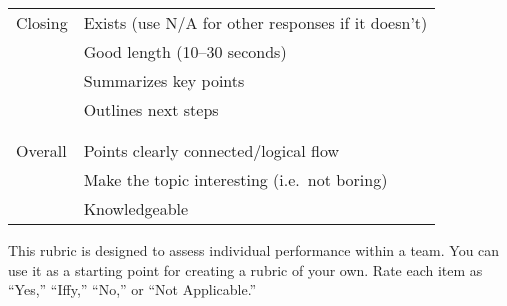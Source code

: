 \begin{longtable}{p{}p{}}
  Closing
  & Exists (use N/A for other responses if it doesn't) \\
  & Good length (10--30 seconds) \\
  & Summarizes key points \\
  & Outlines next steps \\
  \\ [-1.5ex] \hline \\ [-1.5ex]

  Overall
  & Points clearly connected/logical flow \\
  & Make the topic interesting (i.e.\ not boring) \\
  & Knowledgeable \\

\end{longtable}


This rubric is designed to assess individual performance within a
team. You can use it as a starting point for creating a rubric of
your own. Rate each item as ``Yes,'' ``Iffy,'' ``No,'' or ``Not Applicable.''

